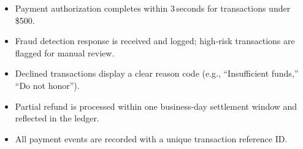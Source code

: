 \begin{tcolorbox}
  \begin{tcolorbox}[
    enhanced,
    colback=bgLight,
    colframe=statusPass,
    boxrule=0.5pt,
    left=10pt,
    right=10pt,
    top=6pt,
    bottom=6pt,
    sharp corners,
    title={\passmark\ Acceptance Criteria},
    fonttitle=\bfseries\color{statusPass}
  ]
    \begin{itemize}[nosep, leftmargin=*]
      \item Payment authorization completes within 3\,seconds for transactions under \$500.
      \item Fraud detection response is received and logged; high-risk transactions are flagged for manual review.
      \item Declined transactions display a clear reason code (e.g., ``Insufficient funds,'' ``Do not honor'').
      \item Partial refund is processed within one business-day settlement window and reflected in the ledger.
      \item All payment events are recorded with a unique transaction reference ID.
    \end{itemize}
  \end{tcolorbox}
\end{tcolorbox}

\newpage

